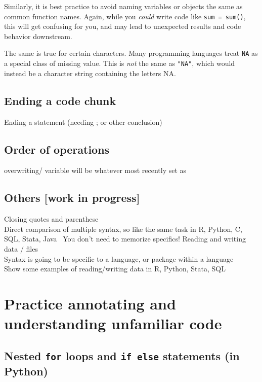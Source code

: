 \documentclass[
]{book}
\begin{document}
Similarly, it is best practice to avoid naming variables or objects the
same as common function names. Again, while you \emph{could} write code like
\texttt{sum\ =\ sum()}, this will get confusing for you, and may lead to
unexpected results and code behavior downstream.

The same is true for certain characters. Many programming languages
treat \texttt{NA} as a special class of missing value. This is \emph{not} the same
as \texttt{"NA"}, which would instead be a character string containing the
letters NA.

\section{Ending a code chunk}\label{ending-a-code-chunk}

Ending a statement (needing ; or other conclusion)

\section{Order of operations}\label{order-of-operations-1}

overwriting/ variable will be whatever most recently set as

\section{Others {[}work in progress{]}}\label{others-work-in-progress}

Closing quotes and parenthese\\
Direct comparison of multiple syntax, so like the same task in R,
Python, C, SQL, Stata, Java~ You don't need to memorize specifics!
Reading and writing data / files\\
Syntax is going to be specific to a language, or package within a
language\\
Show some examples of reading/writing data in R, Python, Stata, SQL

\chapter{Practice annotating and understanding unfamiliar code}\label{practice-annotating-and-understanding-unfamiliar-code}

\section{\texorpdfstring{Nested \texttt{for} loops and \texttt{if\ else} statements (in Python)}{Nested for loops and if else statements (in Python)}}\label{nested-for-loops-and-if-else-statements-in-python}
\end{document}
